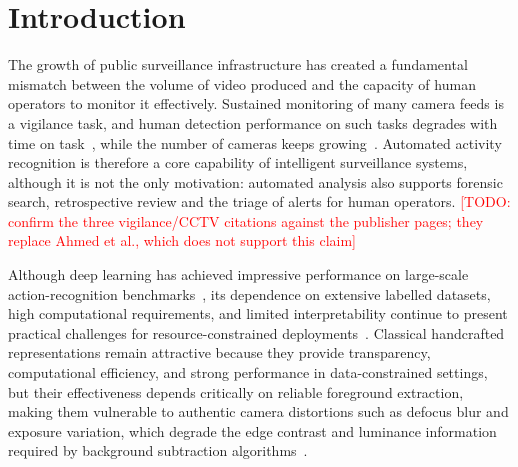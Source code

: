 \documentclass[runningheads]{llncs}
\newcommand{\todo}[1]{\textcolor{red}{[TODO: #1]}}
\begin{document}
\section{Introduction}

The growth of public surveillance infrastructure has created a 
fundamental mismatch between the volume of video produced and 
the capacity of human operators to monitor it effectively. 
Sustained monitoring of many camera feeds is a vigilance task, and human 
detection performance on such tasks degrades with time on task~\cite{warm2008vigilance,donald2015classification}, 
while the number of cameras keeps growing~\cite{tsakanikas2017video}. Automated activity 
recognition is therefore a core capability of intelligent surveillance systems, although 
it is not the only motivation: automated analysis also supports forensic search, 
retrospective review and the triage of alerts for human operators. 
\todo{confirm the three vigilance/CCTV citations against the publisher pages; they replace Ahmed et al., which does not support this claim}

Although deep learning has achieved impressive performance on large-scale 
action-recognition benchmarks~\cite{ur2023use,xiao2016overview}, its dependence 
on extensive labelled datasets, high computational requirements, and limited 
interpretability continue to present practical challenges for resource-constrained 
deployments~\cite{csurka2018handcrafted,arias2018deep}. Classical handcrafted 
representations remain attractive because they provide transparency, computational 
efficiency, and strong performance in data-constrained settings, but their 
effectiveness depends critically on reliable foreground extraction, making 
them vulnerable to authentic camera distortions such as defocus blur and exposure 
variation, which degrade the edge contrast and luminance information required by 
background subtraction algorithms~\cite{gillani2025distortion}.
\end{document}
